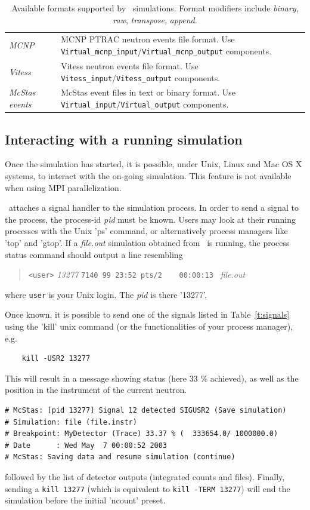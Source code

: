 \begin{table}
\begin{center}
{\begin{tabular}{|p{}|c|p{}|}
      {\it MCNP} &  & MCNP PTRAC neutron events file format. Use
        \verb+Virtual_mcnp_input+/\verb+Virtual_mcnp_output+ components.\index{MCNP}\\
      {\it Vitess} &  & Vitess neutron events file format. Use \verb+Vitess_input+/\verb+Vitess_output+ components.\index{Vitess}\\
      {\it McStas events} & & McStas event files in text or binary
      format. Use \verb+Virtual_input+/\verb+Virtual_output+ components.\\
      \hline
    \end{tabular}
    \caption{Available formats supported by \MCS\ simulations. Format modifiers include \emph{binary}, \emph{raw}, \emph{transpose}, \emph{append}.}
    \label{t:formatoptions}
    }
  \end{center}
\end{table}

\subsection{Interacting with a running simulation}

Once the simulation has started, it is possible, under Unix, Linux and Mac OS X systems, to interact with the on-going simulation. This feature is not available when using MPI parallelization.

\MCS\ attaches a signal handler to the simulation process. In order to send a signal to the process, the process-id {\it pid} must be known. Users may look at their running processes with the Unix 'ps' command, or alternatively process managers like 'top' and 'gtop'.
If a {\it file.out} simulation obtained from \MCS\ is running, the process status command should output a line resembling
\begin{quote}
  \verb|<user>| {\it 13277} \verb|7140 99 23:52 pts/2    00:00:13 | {\it file.out}\\
\end{quote}
where \verb+user+ is your Unix login. The {\it pid} is there '13277'.

Once known, it is possible to send one of the signals listed in Table~\ref{t:signals} using the 'kill' unix command (or the functionalities of your process manager), e.g.
\begin{verbatim}
    kill -USR2 13277
\end{verbatim}
This will result in a message showing status (here 33 \% achieved), as well as the position in the instrument of the current neutron.
\begin{verbatim}
# McStas: [pid 13277] Signal 12 detected SIGUSR2 (Save simulation)
# Simulation: file (file.instr)
# Breakpoint: MyDetector (Trace) 33.37 % (  333654.0/ 1000000.0)
# Date      : Wed May  7 00:00:52 2003
# McStas: Saving data and resume simulation (continue)
\end{verbatim}
followed by the list of detector outputs (integrated counts and files). Finally, sending a \verb+kill 13277+ (which is equivalent to \verb+kill -TERM 13277+) will end the simulation before the initial 'ncount' preset.


